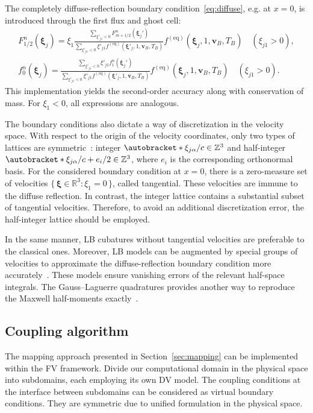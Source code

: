 \documentclass[]{elsarticle} %
\newcommand{\Set}[2]{\{\,{#1}:{#2}\,\}}
\DeclarePairedDelimiter\autobracket()       %
\newcommand{\br}[1]{\autobracket*{#1}}
\newcommand{\bxi}{\boldsymbol{\xi}}
\newcommand{\bv}{\boldsymbol{v}}
\newcommand{\equil}[1]{#1^\mathrm{(eq)}}
\newcommand{\xiai}{\xi_{j \alpha}}
\begin{document}
The completely diffuse-reflection boundary condition~\eqref{eq:diffuse}, e.g. at \(x=0\),
is introduced through the first flux and ghost cell:
\begin{gather}
    F_{1/2}^n(\bxi_j) = \displaystyle\xi_1\frac{\sum_{\xi'_{j1}<0}F_{m+1/2}^n(\bxi_j')}
        {\sum_{\xi'_{j1}<0}\xi'_{j1}\equil{f}(\bxi'_j,1,\bv_B,T_B)}
        \equil{f}(\bxi_j, 1, \bv_B, T_B) \quad (\xi_{j1}>0), \label{eq:first_flux}\\
    f_0^n(\bxi_j) = \displaystyle\frac{\sum_{\xi'_{j1}<0}\xi'_{j1}f_1^n(\bxi_j')}
        {\sum_{\xi'_{j1}<0}\xi'_{j1}\equil{f}(\bxi'_j,1,\bv_B,T_B)}
        \equil{f}(\bxi_j, 1, \bv_B, T_B) \quad (\xi_{j1}>0). \label{eq:first_ghost}
\end{gather}
This implementation yields the second-order accuracy along with conservation of mass.
For \(\xi_1<0\), all expressions are analogous.

The boundary conditions also dictate a way of discretization in the velocity space.
With respect to the origin of the velocity coordinates, only two types of lattices are symmetric~\cite{Inamuro1990}:
integer \(\br{\xiai/c} \in \mathbb{Z}^3\) and half-integer \(\br{\xiai/c + e_i/2} \in \mathbb{Z}^3\),
where \(e_i\) is the corresponding orthonormal basis.
For the considered boundary condition at \(x=0\), there is a zero-measure set of velocities
\(\Set{\bxi\in\mathbb{R}^3}{\xi_1=0}\), called tangential.
These velocities are immune to the diffuse reflection.
In contrast, the integer lattice contains a substantial subset of tangential velocities.
Therefore, to avoid an additional discretization error, the half-integer lattice should be employed.

In the same manner, LB cubatures without tangential velocities are preferable to the classical ones.
Moreover, LB models can be augmented by special groups of velocities to approximate
the diffuse-reflection boundary condition more accurately~\cite{Feuchter2016}.
These models ensure vanishing errors of the relevant half-space integrals.
The Gauss--Laguerre quadratures provides another way to reproduce the Maxwell half-moments exactly~\cite{Ambrus2014, Ambrus2016}.

\subsection{Coupling algorithm}\label{sec:numerics:coupling}

The mapping approach presented in Section~\ref{sec:mapping} can be implemented within the FV framework.
Divide our computational domain in the physical space into subdomains, each employing its own DV model.
The coupling conditions at the interface between subdomains can be considered as virtual boundary conditions.
They are symmetric due to unified formulation in the physical space.
\end{document}
